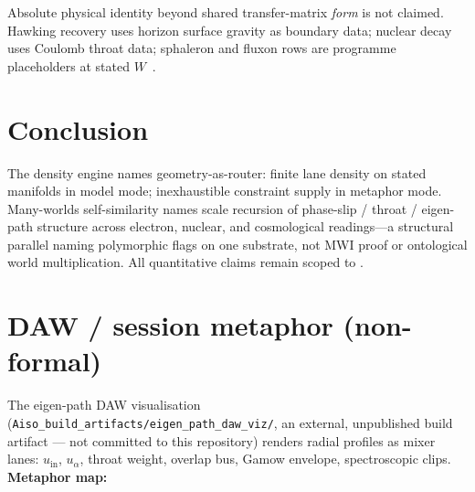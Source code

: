 \documentclass[11pt,a4paper]{article}
\theoremstyle{remark}
\theoremstyle{definition}
\begin{document}
Absolute physical identity beyond shared transfer-matrix \emph{form} is not
claimed.  Hawking recovery uses horizon surface gravity as boundary data;
nuclear decay uses Coulomb throat data; sphaleron and fluxon rows are
programme placeholders at stated $W$~\cite{FlagDecay2026}.

\section{Conclusion}
\label{sec:conclusion}

The density engine names geometry-as-router: finite lane density on stated
manifolds in model mode; inexhaustible constraint supply in metaphor mode.
Many-worlds self-similarity names scale recursion of phase-slip / throat /
eigen-path structure across electron, nuclear, and cosmological readings---a
structural parallel naming polymorphic flags on one substrate, not MWI proof or
ontological world multiplication.  All quantitative claims remain scoped to
\cite{Mobius2026,FlagDecay2026,PalphaRefined2026,KFM2026}.

\appendix
\section{DAW / session metaphor (non-formal)}
\label{app:daw}

The eigen-path DAW visualisation (\nolinkurl{Aiso_build_artifacts/eigen_path_daw_viz/},
an external, unpublished build artifact --- not committed to this repository)
renders radial profiles as mixer lanes: $u_{\mathrm{in}}$, $u_\alpha$, throat
weight, overlap bus, Gamow envelope, spectroscopic clips.  \textbf{Metaphor
map:}
\end{document}

